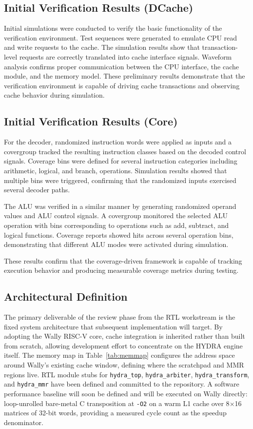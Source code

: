 \documentclass[conference]{IEEEtran}
\begin{document}
\subsection{Initial Verification Results (DCache)}
Initial simulations were conducted to verify the basic functionality of the verification environment. Test sequences were generated to emulate CPU read and write requests to the cache.
The simulation results show that transaction-level requests are correctly translated into cache interface signals. Waveform analysis confirms proper communication between the CPU interface, the cache module, and the memory model.
These preliminary results demonstrate that the verification environment is capable of driving cache transactions and observing cache behavior during simulation.

\subsection{Initial Verification Results (Core)}
For the decoder, randomized instruction words were applied as inputs and a covergroup tracked the resulting instruction classes based on the decoded control signals. Coverage bins were defined for several instruction categories including arithmetic, logical, and branch, operations. Simulation results showed that multiple bins were triggered, confirming that the randomized inputs exercised several decoder paths.

The ALU was verified in a similar manner by generating randomized operand values and ALU control signals. A covergroup monitored the selected ALU operation with bins corresponding to operations such as add, subtract, and logical functions. Coverage reports showed hits across several operation bins, demonstrating that different ALU modes were activated during simulation.

These results confirm that the coverage-driven framework is capable of tracking execution behavior and producing measurable coverage metrics during testing.

\subsection{Architectural Definition}
The primary deliverable of the review phase from the RTL workstream is the fixed system architecture that subsequent implementation will target. By adopting the Wally RISC-V core, cache integration is inherited rather than built from scratch, allowing development effort to concentrate on the HYDRA engine itself. The memory map in Table~\ref{tab:memmap} configures the address space around Wally's existing cache window, defining where the scratchpad and MMR regions live. RTL module stubs for \texttt{hydra\_top}, \texttt{hydra\_arbiter}, \texttt{hydra\_transform}, and \texttt{hydra\_mmr} have been defined and committed to the repository. A software performance baseline will soon be defined and will be executed on Wally directly: loop-unrolled bare-metal C transposition at \texttt{-O2} on a warm L1 cache over 8$\times$16 matrices of 32-bit words, providing a measured cycle count as the speedup denominator.
\end{document}
